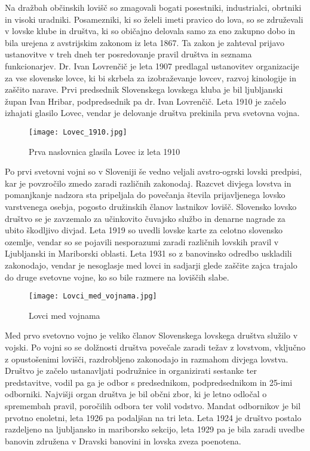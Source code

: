 \documentclass[a4paper,12pt,openright]{book}
\begin{document}
Na dražbah občinskih lovišč so zmagovali bogati posestniki, industrialci, obrtniki in visoki uradniki. 
Posamezniki, ki so želeli imeti pravico do lova, so se združevali v lovske klube in društva, ki so običajno delovala samo za eno zakupno dobo in bila urejena z avstrijskim zakonom iz leta 1867. 
Ta zakon je zahteval prijavo ustanovitve v treh dneh ter posredovanje pravil društva in seznama funkcionarjev.
Dr. Ivan Lovrenčič je leta 1907 predlagal ustanovitev organizacije za vse slovenske lovce, ki bi skrbela za izobraževanje lovcev, razvoj kinologije in zaščito narave. 
Prvi predsednik Slovenskega lovskega kluba je bil ljubljanski župan Ivan Hribar, podpredsednik pa dr. Ivan Lovrenčič. 
Leta 1910 je začelo izhajati glasilo Lovec, vendar je delovanje društva prekinila prva svetovna vojna.\cite{Lov_65_85}

\begin{figure}[h!] 
  \centering
  \texttt{[image: Lovec\_1910.jpg]}
  \caption{Prva naslovnica glasila Lovec iz leta 1910 \cite{bolcina_osebna}}
  \label{fig:lovec_1910}
\end{figure}

Po prvi svetovni vojni so v Sloveniji še vedno veljali avstro-ogrski lovski predpisi, kar je povzročilo zmedo zaradi različnih zakonodaj. 
Razcvet divjega lovstva in pomanjkanje nadzora sta pripeljala do povečanja števila prijavljenega lovsko varstvenega osebja, pogosto družinskih članov lastnikov lovišč. 
Slovensko lovsko društvo se je zavzemalo za učinkovito čuvajsko službo in denarne nagrade za ubito škodljivo divjad.
Leta 1919 so uvedli lovske karte za celotno slovensko ozemlje, vendar so se pojavili nesporazumi zaradi različnih lovskih pravil v Ljubljanski in Mariborski oblasti.
Leta 1931 so z banovinsko odredbo uskladili zakonodajo, vendar je nesoglasje med lovci in sadjarji glede zaščite zajca trajalo do druge svetovne vojne, ko so bile razmere na loviščih slabe.\cite{Lov_93_120}

\begin{figure}[h!] 
  \centering
  \texttt{[image: Lovci\_med\_vojnama.jpg]}  %
  \caption{Lovci med vojnama\cite{bolcina_osebna}}
  \label{fig:lovci_med_vojnama}
\end{figure}

Med prvo svetovno vojno je veliko članov Slovenskega lovskega društva služilo v vojski. 
Po vojni so se dolžnosti društva povečale zaradi težav z lovstvom, vključno z opustošenimi lovišči, razdrobljeno zakonodajo in razmahom divjega lovstva.
Društvo je začelo ustanavljati podružnice in organizirati sestanke ter predstavitve, vodil pa ga je odbor s predsednikom, podpredsednikom in 25-imi odborniki. 
Najvišji organ društva je bil občni zbor, ki je letno odločal o spremembah pravil, poročilih odbora ter volil vodstvo. 
Mandat odbornikov je bil prvotno enoletni, leta 1926 pa podaljšan na tri leta.
Leta 1924 je društvo postalo razdeljeno na ljubljansko in mariborsko sekcijo, leta 1929 pa je bila zaradi uvedbe banovin združena v Dravski banovini in lovska zveza poenotena.\cite{Lov_129_149}
\end{document}
